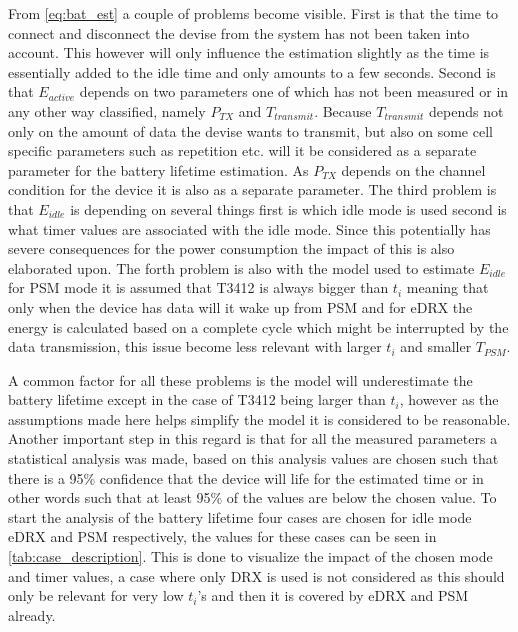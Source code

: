 From \autoref{eq:bat_est} a couple of problems become visible. First is that the time to connect and disconnect the devise from the system has not been taken into account. This however will only influence the estimation slightly as the time is essentially added to the idle time and only amounts to a few seconds. Second is that $E_{active}$ depends on two parameters one of which has not been measured or in any other way classified, namely $P_{TX}$ and $T_{transmit}$. Because $T_{transmit}$ depends not only on the amount of data the devise wants to transmit, but also on some cell specific parameters such as repetition etc. will it be considered as a separate parameter for the battery lifetime estimation. As $P_{TX}$ depends on the channel condition for the device it is also as a separate parameter. The third problem is that $E_{idle}$ is depending on several things first is which idle mode is used second is what timer values are associated with the idle mode. Since this potentially has severe consequences for the power consumption the impact of this is also elaborated upon. The forth problem is also with the model used to estimate $E_{idle}$ for PSM mode it is assumed that T3412 is always bigger than $t_i$ meaning that only when the device has data will it wake up from PSM and for eDRX the energy is calculated based on a complete cycle which might be interrupted by the data transmission, this issue become less relevant with larger $t_i$ and smaller $T_{PSM}$. 

A common factor for all these problems is the model will underestimate the battery lifetime except in the case of T3412 being larger than $t_i$, however as the assumptions made here helps simplify the model it is considered to be reasonable. Another important step in this regard is that for all the measured parameters a statistical analysis was made, based on this analysis values are chosen such that there is a 95\% confidence that the device will life for the estimated time or in other words such that at least 95\% of the values are below the chosen value. To start the analysis of the battery lifetime four cases are chosen for idle mode eDRX and PSM respectively, the values for these cases can be seen in \autoref{tab:case_description}. This is done to visualize the impact of the chosen mode and timer values, a case where only DRX is used is not considered as this should only be relevant for very low $t_i$'s and then it is covered by eDRX and PSM already.

